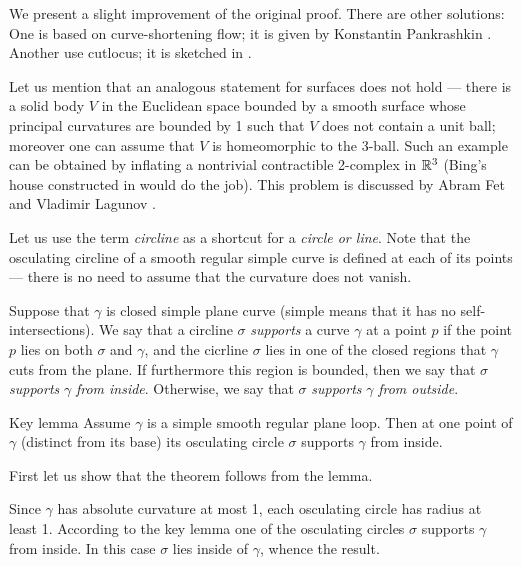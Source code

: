 \documentclass{article}
\begin{document}
We present %
a slight improvement of the original proof.
There are other solutions: 
One is based on curve-shortening flow; it is given by Konstantin Pankrashkin  \cite{pankrashkin}.
Another use cutlocus; it is sketched in %
\cite[Problem 1.7.19]{toponogov}.

Let us mention that an analogous statement for surfaces does not hold --- there is a solid body $V$ in the Euclidean space bounded by a smooth surface whose principal curvatures are bounded by 1 such that $V$ does not contain a unit ball; moreover one can assume that $V$ is homeomorphic to the 3-ball.
Such an example can be obtained by inflating a nontrivial contractible 2-complex in $\mathbb{R}^3$ 
(Bing's house constructed in \cite{bing} would do the job).
This problem is discussed by Abram Fet and Vladimir Lagunov \cite{lagunov-2,lagunov-fet}%
.

\medskip

Let us use the term \emph{circline} as a shortcut for a \emph{circle or line}.
Note that the osculating circline of a smooth regular simple curve is defined at each of its points --- there is no need to assume that the curvature does not vanish.

Suppose that $\gamma$ is closed simple plane curve (simple means that it has no self-intersections).
We say that a circline $\sigma$ \emph{supports} a curve $\gamma$ at a point $p$ if the point $p$ lies on both $\sigma$ and $\gamma$, and the cicrline $\sigma$ lies in one of the closed regions that $\gamma$ cuts from the plane.
If furthermore this region is bounded, then  we say that $\sigma$ \emph{supports} $\gamma$ \emph{from inside}.
Otherwise, we say that $\sigma$ \emph{supports} $\gamma$ \emph{from outside}.



\begin{thm}{Key lemma}\label{thm:moon}
Assume $\gamma$ is a simple smooth regular plane loop.
Then at one point of $\gamma$ (distinct from its base) its osculating circle $\sigma$ %
 supports $\gamma$ from inside.
\end{thm}

First let us show that the theorem follows from the lemma.

Since $\gamma$ has absolute curvature at most 1, each osculating circle has radius at least 1.
According to the key lemma one of the osculating circles $\sigma$ supports $\gamma$ from inside.
In this case $\sigma$ lies inside of $\gamma$, whence the result.
\qeds
\end{document}

